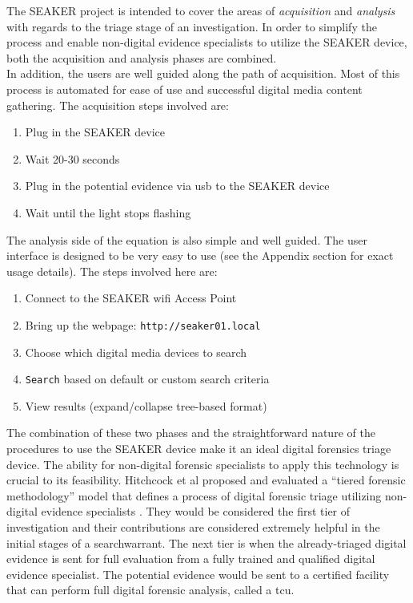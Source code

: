 \documentclass[12pt]{article}
\begin{document}
The SEAKER project is intended to cover the areas of {\em acquisition} and {\em analysis}
with regards to the triage stage of an investigation.  In order to simplify the process and
enable non-digital evidence specialists to utilize the SEAKER device, both the
acquisition and analysis phases are combined.\\

In addition, the users are well guided along the path of acquisition.  Most of this process is
automated for ease of use and successful digital media content gathering.  The acquisition 
steps involved are:

\vspace{0.5 cm}
\begin{enumerate}
  \item Plug in the SEAKER device
  \item Wait 20-30 seconds
  \item Plug in the potential evidence via \gls{usb} to the SEAKER device
  \item Wait until the light stops flashing
\end{enumerate}
\vspace{0.5 cm}

The analysis side of the equation is also simple and well guided.  The user interface is 
designed to be very easy to use (see the Appendix section for exact usage details).  The steps
involved here are:

\vspace{0.5 cm}
\begin{enumerate}
  \item Connect to the SEAKER \gls{wifi} Access Point
  \item Bring up the webpage: {\tt http://seaker01.local}
  \item Choose which digital media devices to search
  \item \verb|Search| based on default or custom search criteria
  \item View results (expand/collapse tree-based format)
\end{enumerate}
\vspace{0.5 cm}

The combination of these two phases and the straightforward nature of the procedures to use
the SEAKER device make it an ideal digital forensics triage device.  The ability for
non-digital forensic specialists to apply this technology is crucial to its feasibility.
Hitchcock et al proposed and evaluated a ``tiered forensic
methodology'' model that defines a process of digital forensic triage utilizing non-digital
evidence specialists \cite{hitchcock2016tiered}.  They would be considered the first tier of
investigation and their
contributions are considered extremely helpful in the initial stages of a \gls{searchwarrant}.
The next tier is when the already-triaged digital evidence is sent for full evaluation from
a fully trained and qualified digital evidence specialist.
The potential evidence would be sent to a certified facility that can perform full digital
forensic analysis, called a \gls{tcu}.\\
\end{document}
